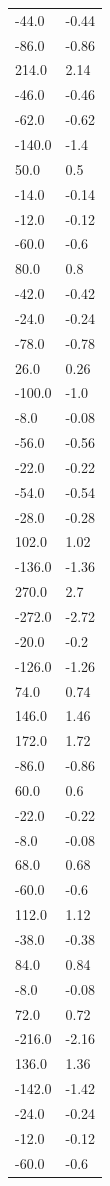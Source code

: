 \begin{longtable}{ll}
-44.0 & -0.44 \\
-86.0 & -0.86 \\
214.0 & 2.14 \\
-46.0 & -0.46 \\
-62.0 & -0.62 \\
-140.0 & -1.4 \\
50.0 & 0.5 \\
-14.0 & -0.14 \\
-12.0 & -0.12 \\
-60.0 & -0.6 \\
80.0 & 0.8 \\
-42.0 & -0.42 \\
-24.0 & -0.24 \\
-78.0 & -0.78 \\
26.0 & 0.26 \\
-100.0 & -1.0 \\
-8.0 & -0.08 \\
-56.0 & -0.56 \\
-22.0 & -0.22 \\
-54.0 & -0.54 \\
-28.0 & -0.28 \\
102.0 & 1.02 \\
-136.0 & -1.36 \\
270.0 & 2.7 \\
-272.0 & -2.72 \\
-20.0 & -0.2 \\
-126.0 & -1.26 \\
74.0 & 0.74 \\
146.0 & 1.46 \\
172.0 & 1.72 \\
-86.0 & -0.86 \\
60.0 & 0.6 \\
-22.0 & -0.22 \\
-8.0 & -0.08 \\
68.0 & 0.68 \\
-60.0 & -0.6 \\
112.0 & 1.12 \\
-38.0 & -0.38 \\
84.0 & 0.84 \\
-8.0 & -0.08 \\
72.0 & 0.72 \\
-216.0 & -2.16 \\
136.0 & 1.36 \\
-142.0 & -1.42 \\
-24.0 & -0.24 \\
-12.0 & -0.12 \\
-60.0 & -0.6 \\

\end{longtable}
